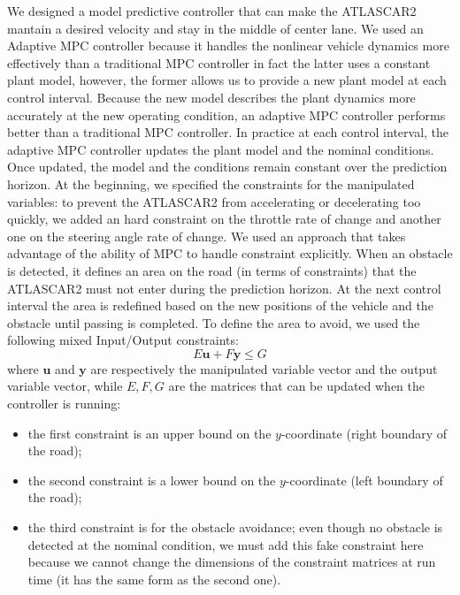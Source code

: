 \documentclass[conference, 11pt]{IEEEtran}
\begin{document}
We designed a model predictive controller that can make the ATLASCAR2 mantain a desired velocity and stay in the middle of center lane. We used an Adaptive MPC controller because it handles the nonlinear vehicle dynamics more effectively than a traditional MPC controller in fact the latter uses a constant plant model, however, the former allows us to provide a new plant model at each control interval. Because the new model describes the plant dynamics more accurately at the new operating condition, an adaptive MPC controller performs better than a traditional MPC controller. In practice at each control interval, the adaptive MPC controller updates the plant model and the nominal conditions. Once updated, the model and the conditions remain constant over the prediction horizon. At the beginning, we specified the constraints for the manipulated variables: to prevent the ATLASCAR2 from accelerating or decelerating too quickly, we added an hard constraint on the throttle rate of change and another one on the steering angle rate of change. We used an approach that takes advantage of the ability of MPC to handle constraint explicitly. When an obstacle is detected, it defines an area on the road (in terms of constraints) that the ATLASCAR2 must not enter during the prediction horizon. At the next control interval the area is redefined based on the new positions of the vehicle and the obstacle until passing is completed.
To define the area to avoid, we used the following mixed Input/Output constraints:
\begin{equation*}
	\label{eqn:mixed_IO_constraints}
	E\textbf{u}+F\textbf{y}\leq G
\end{equation*}
where $\textbf{u}$ and $\textbf{y}$ are respectively the manipulated variable vector and the output variable vector, while $E,F,G$ are the matrices that can be updated when the controller is running:
\begin{itemize}
	\item the first constraint is an upper bound on the $y$-coordinate (right boundary of the road);
	\item the second constraint is a lower bound on the $y$-coordinate (left boundary of the road);
	\item the third constraint is for the obstacle avoidance; even though no obstacle is detected at the nominal condition, we must add this fake constraint here because we cannot change the dimensions of the constraint matrices at run time (it has the same form as the second one).
\end{itemize}
\end{document}
